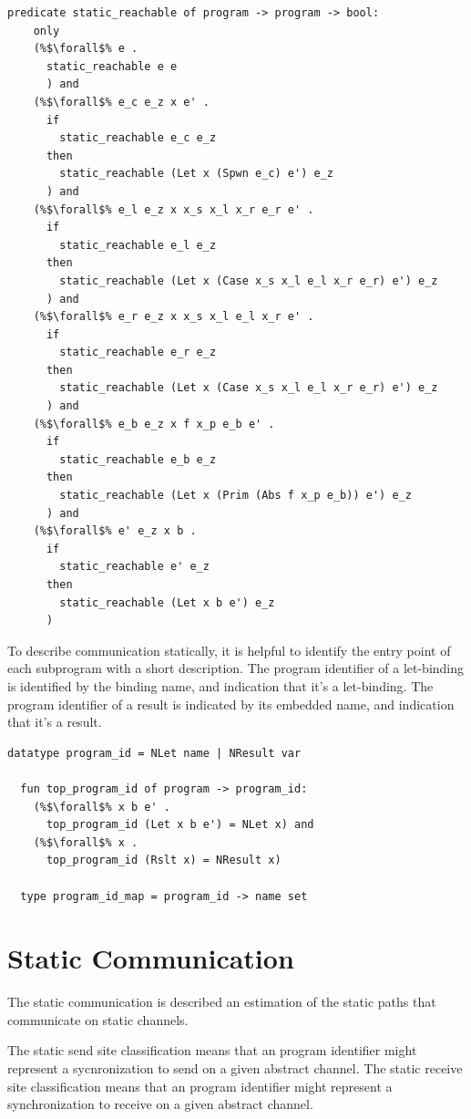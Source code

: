 \documentclass{article}
\begin{document}
\begin{lstlisting}[language=logic, escapechar=\%]
  predicate static_reachable of program -> program -> bool:
    only
    (%$\forall$% e .
      static_reachable e e
      ) and
    (%$\forall$% e_c e_z x e' . 
      if
        static_reachable e_c e_z
      then
        static_reachable (Let x (Spwn e_c) e') e_z
      ) and
    (%$\forall$% e_l e_z x x_s x_l x_r e_r e' . 
      if
        static_reachable e_l e_z
      then
        static_reachable (Let x (Case x_s x_l e_l x_r e_r) e') e_z
      ) and
    (%$\forall$% e_r e_z x x_s x_l e_l x_r e' . 
      if
        static_reachable e_r e_z
      then
        static_reachable (Let x (Case x_s x_l e_l x_r e_r) e') e_z
      ) and
    (%$\forall$% e_b e_z x f x_p e_b e' . 
      if
        static_reachable e_b e_z
      then
        static_reachable (Let x (Prim (Abs f x_p e_b)) e') e_z
      ) and
    (%$\forall$% e' e_z x b . 
      if
        static_reachable e' e_z
      then
        static_reachable (Let x b e') e_z
      )
  \end{lstlisting}

To describe communication statically, it is helpful to identify the entry
point of each subprogram with a short description. The program identifier of a let-binding is
identified by the binding name, and indication that it's a let-binding. The program identifier
of a result is indicated by its embedded name, and indication that it's a result.

\begin{lstlisting}[language=logic, escapechar=\%]
  datatype program_id = NLet name | NResult var

  fun top_program_id of program -> program_id:
    (%$\forall$% x b e' . 
      top_program_id (Let x b e') = NLet x) and
    (%$\forall$% x . 
      top_program_id (Rslt x) = NResult x)

  type program_id_map = program_id -> name set

\end{lstlisting}

\section{Static Communication}
The static communication is described an estimation of the static paths that communicate on
static channels.

The static send site classification means that an program identifier might represent a
sycnronization to send on a given abstract channel.
The static receive site classification means that an program identifier might represent a
synchronization to receive on a given abstract channel. 
\end{document}
